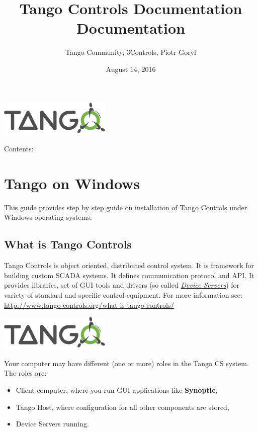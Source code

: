 \documentclass[letterpaper,10pt,english]{sphinxmanual}
\title{Tango Controls Documentation Documentation}
\date{August 14, 2016}
\author{Tango Community, 3Controls, Piotr Goryl}
\begin{document}
\maketitle
\tableofcontents
{}\label{index::doc}
{\hfill\includegraphics{logo_tangocontrols.png}\hfill}



Contents:


\chapter{Tango on Windows}
\label{tango-on-windows:tango-on-windows}\label{tango-on-windows::doc}\label{tango-on-windows:welcome-to-tango-controls-documentation}
This guide provides step by step guide on installation of Tango Controls under Windows operating systems.


\section{What is Tango Controls}
\label{tango-on-windows:what-is-tango-controls}
Tango Controls is object oriented, distributed control system. It is framework for building custom SCADA systems.
It defines communication protocol and API. It provides libraries, set of GUI tools and drivers (so called
{\hyperref[glossary:term-device-servers]{\emph{Device Servers}}}) for variety of standard and specific control equipment. For more information see:
\href{http://www.tango-controls.org/what-is-tango-controls/}{http://www.tango-controls.org/what-is-tango-controls/}

{\hfill\includegraphics{logo_tangocontrols.png}\hfill}

Your computer may have different (one or more) roles in the Tango CS system. The roles are:
\begin{itemize}
\item {} 
Client computer, where you run GUI applications like \textbf{Synoptic},

\item {} 
Tango Host, where configuration for all other components are stored,

\item {} 
Device Servers running.

\end{itemize}
\end{document}
